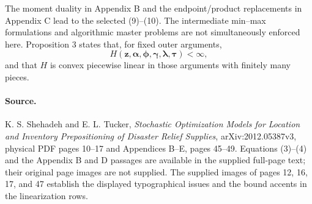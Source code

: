 \documentclass{article}
\begin{document}
The moment duality in Appendix B and the endpoint/product replacements in Appendix C
lead to the selected (9)--(10). The intermediate min--max formulations and algorithmic
master problems are not simultaneously enforced here. Proposition 3 states that, for
fixed outer arguments,
\[
H(\boldsymbol z,\boldsymbol\alpha,\boldsymbol\phi,
\boldsymbol\gamma,\boldsymbol\lambda,\boldsymbol\tau)<\infty,
\]
and that $H$ is convex piecewise linear in those arguments with finitely many pieces.

\paragraph{Source.}
K. S. Shehadeh and E. L. Tucker, \emph{Stochastic Optimization Models for Location and
Inventory Prepositioning of Disaster Relief Supplies}, arXiv:2012.05387v3,
physical PDF pages 10--17 and Appendices B--E, pages 45--49. Equations (3)--(4) and the
Appendix B and D passages are available in the supplied full-page text; their original
page images are not supplied. The supplied images of pages 12, 16, 17, and 47 establish
the displayed typographical issues and the bound accents in the linearization rows.
\end{document}
